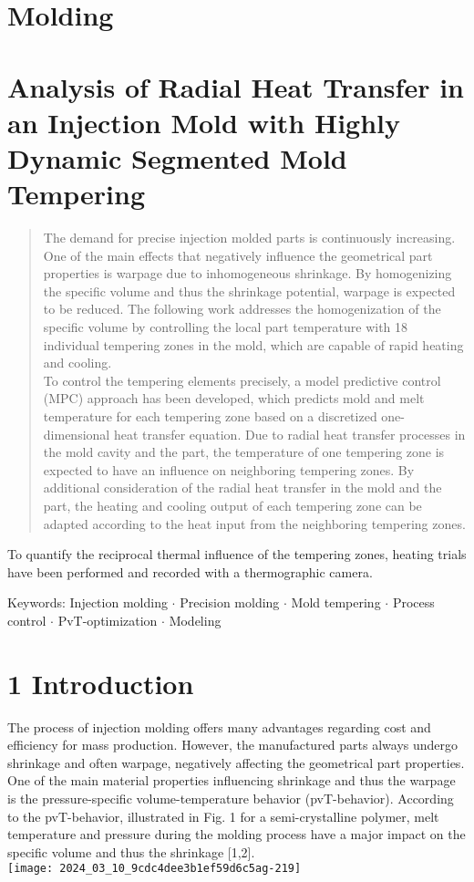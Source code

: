 \documentclass[10pt]{article}
\begin{document}
\section*{Molding}
\section*{Analysis of Radial Heat Transfer in an Injection Mold with Highly Dynamic Segmented Mold Tempering }


\begin{abstract}
The demand for precise injection molded parts is continuously increasing. One of the main effects that negatively influence the geometrical part properties is warpage due to inhomogeneous shrinkage. By homogenizing the specific volume and thus the shrinkage potential, warpage is expected to be reduced. The following work addresses the homogenization of the specific volume by controlling the local part temperature with 18 individual tempering zones in the mold, which are capable of rapid heating and cooling.\\
To control the tempering elements precisely, a model predictive control (MPC) approach has been developed, which predicts mold and melt temperature for each tempering zone based on a discretized one-dimensional heat transfer equation. Due to radial heat transfer processes in the mold cavity and the part, the temperature of one tempering zone is expected to have an influence on neighboring tempering zones. By additional consideration of the radial heat transfer in the mold and the part, the heating and cooling output of each tempering zone can be adapted according to the heat input from the neighboring tempering zones.
\end{abstract}

To quantify the reciprocal thermal influence of the tempering zones, heating trials have been performed and recorded with a thermographic camera.

Keywords: Injection molding $\cdot$ Precision molding $\cdot$ Mold tempering $\cdot$ Process control $\cdot$ PvT-optimization $\cdot$ Modeling

\section*{1 Introduction}
The process of injection molding offers many advantages regarding cost and efficiency for mass production. However, the manufactured parts always undergo shrinkage and often warpage, negatively affecting the geometrical part properties. One of the main material properties influencing shrinkage and thus the warpage is the pressure-specific volume-temperature behavior (pvT-behavior). According to the pvT-behavior, illustrated in Fig. 1 for a semi-crystalline polymer, melt temperature and pressure during the molding process have a major impact on the specific volume and thus the shrinkage [1,2].\\
\texttt{[image: 2024\_03\_10\_9cdc4dee3b1ef59d6c5ag-219]}
\end{document}
